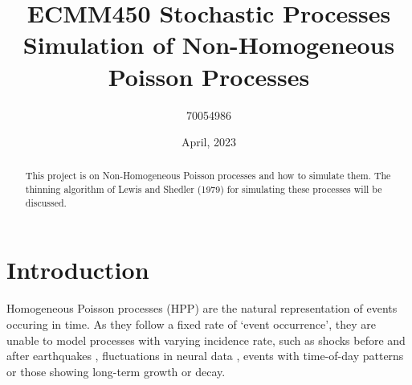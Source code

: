 \documentclass[%
 reprint,
 amsmath,amssymb,
 aps,
]{revtex4-2}
\theoremstyle{definition}
\begin{document}

\title{ECMM450 Stochastic Processes\\Simulation of Non-Homogeneous Poisson Processes}%

\author{70054986}


\date{April, 2023}%

\begin{abstract}
This project is on Non-Homogeneous Poisson processes and how to simulate them. The thinning algorithm of Lewis and Shedler (1979) for simulating these processes will be discussed.

\end{abstract}

\maketitle

\section{\label{sec:level1}Introduction}

Homogeneous Poisson processes (HPP) are the natural representation of events occuring in time. As they follow a fixed rate of `event occurrence', they are unable to model processes with varying incidence rate, such as shocks before and after earthquakes \cite{vere-jones_1970}, fluctuations in neural data \cite{gabbiani_cox_2010}, events with time-of-day patterns or those showing long-term growth or decay.\\
\end{document}
